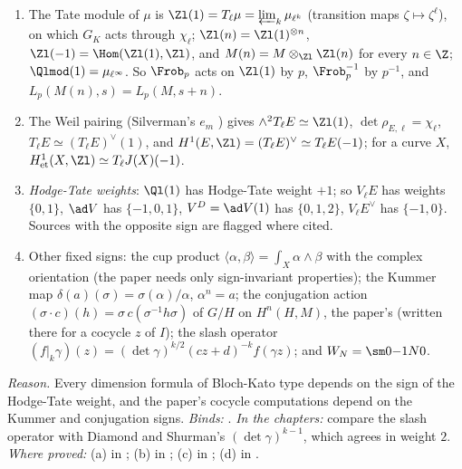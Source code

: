 \begin{convention}\label{conv:notation:bc5}
\leavevmode
\begin{enumerate}[label=(\alph*)]
\item The Tate module of $\mu$ is $\Zl(1)=T_\ell\mu=\varprojlim_k\mu_{\ell^k}$ (transition maps $\zeta\mapsto\zeta^\ell$), on which $G_K$ acts through $\chi_\ell$;
$\Zl(n)=\Zl(1)^{\otimes n}$, $\Zl(-1)=\Hom(\Zl(1),\Zl)$, and $M(n)=M\otimes_{\Zl}\Zl(n)$ for every $n\in\Z$; $\Qlmod(1)=\mu_{\ell^\infty}$. So $\Frob_p$
acts on $\Zl(1)$ by $p$, $\Frob_p^{-1}$ by $p^{-1}$, and $L_p(M(n),s)=L_p(M,s+n)$.
\item The Weil pairing (Silverman's $e_m$ \cite[III.8]{SilvermanAEC}) gives $\wedge^2T_\ell E\simeq\Zl(1)$, $\det\rho_{E,\ell}=\chi_\ell$,
$T_\ell E\simeq(T_\ell E)^\vee(1)$, and $H^1(E,\Zl)=(T_\ell E)^\vee\simeq T_\ell E(-1)$; for a curve $X$, $H^1_{\mathrm{et}}(X,\Zl)\simeq T_\ell J(X)(-1)$.
\item \emph{Hodge-Tate weights}: $\Ql(1)$ has Hodge-Tate weight $+1$; so $V_\ell E$ has weights $\{0,1\}$, $\ad V$ has $\{-1,0,1\}$,
$V^D=\ad V(1)$ has $\{0,1,2\}$, $V_\ell E^\vee$ has $\{-1,0\}$. Sources with the opposite sign are flagged where cited.
\item Other fixed signs: the cup product $\langle\alpha,\beta\rangle=\int_X\alpha\wedge\beta$ with the complex orientation (the paper
needs only sign-invariant properties); the Kummer map $\delta(a)(\sigma)=\sigma(\alpha)/\alpha$, $\alpha^n=a$; the conjugation action
$(\sigma\cdot c)(h)=\sigma\,c(\sigma^{-1}h\sigma)$ of $G/H$ on $H^n(H,M)$, the paper's (written there for a cocycle $z$ of $I$); the slash operator
$(f|_k\gamma)(z)=(\det\gamma)^{k/2}(cz+d)^{-k}f(\gamma z)$; and $W_N=\sm0{-1}N0$.
\end{enumerate}
\end{convention}

\noindent\emph{Reason.} Every dimension formula of Bloch-Kato type depends on the sign of the Hodge-Tate weight, and the paper's
cocycle computations depend on the Kummer and conjugation signs. \emph{Binds:}
.
\emph{In the chapters:}  compare the slash operator with Diamond and Shurman's
$(\det\gamma)^{k-1}$, which agrees in weight $2$. \emph{Where proved:} (a) in ; (b) in
; (c) in ; (d) in .

